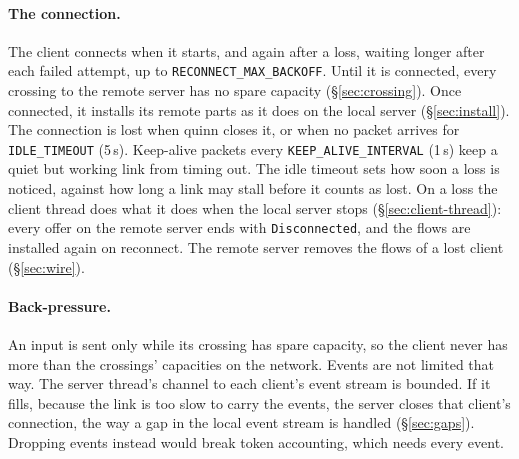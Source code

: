 \documentclass[11pt]{article}
\newcommand{\code}[1]{\texttt{#1}}
\begin{document}
\paragraph{The connection.} The client connects when it starts, and again
after a loss, waiting longer after each failed attempt, up to
\code{RECONNECT\_MAX\_BACKOFF}. Until it is connected, every crossing to the
remote server has no spare capacity (\S\ref{sec:crossing}). Once connected,
it installs its remote parts as it does on the local server
(\S\ref{sec:install}). The connection is lost when quinn closes it, or when
no packet arrives for \code{IDLE\_TIMEOUT} (5\,s). Keep-alive packets every
\code{KEEP\_ALIVE\_INTERVAL} (1\,s) keep a quiet but working link from timing out.
The idle timeout sets how soon a loss is noticed, against how long a link may
stall before it counts as lost. On a loss the client thread does what it does
when the local server stops (\S\ref{sec:client-thread}): every offer on the
remote server ends with \code{Disconnected}, and the flows are installed
again on reconnect. The remote server removes the flows of a lost client
(\S\ref{sec:wire}).

\paragraph{Back-pressure.} An input is sent only while its crossing has
spare capacity, so the client never has more than the crossings' capacities
on the network. Events are not limited that way. The server thread's channel
to each client's event stream is bounded. If it fills, because the link is
too slow to carry the events, the server closes that client's connection,
the way a gap in the local event stream is handled (\S\ref{sec:gaps}).
Dropping events instead would break token accounting, which needs every
event.
\end{document}
